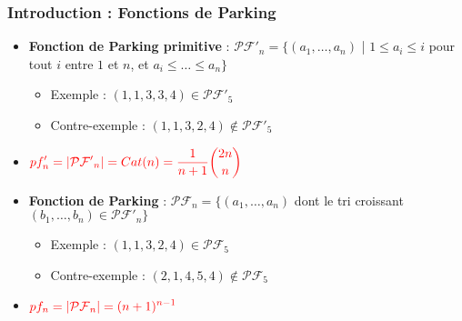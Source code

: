\documentclass{beamer}
\begin{document}
\begin{frame}
    \frametitle{Introduction : Fonctions de Parking}
    \begin{itemize}
        \item \textbf{Fonction de Parking primitive} : $\mathcal{PF'}_n =
            \{(a_1, \ldots, a_n)$ | $1 \leqslant a_i \leqslant i$ pour tout
            $i$ entre $1$ et $n$, et $a_i \leqslant \ldots \leqslant a_n\}$
        \begin{itemize}
            \item Exemple : $(1, 1, 3, 3, 4) \in \mathcal{PF'}_5$
            \item Contre-exemple : $(1, 1, 3, 2, 4) \not \in \mathcal{PF'}_5$
        \end{itemize}
        \item $\color{red}{\displaystyle pf'_n = |\mathcal{PF'}_n| = Cat(n)
            = \frac{1}{n+1}\binom{2n}{n}}$
        \item \textbf{Fonction de Parking} : $\mathcal{PF}_n = \{(a_1,
            \ldots, a_n)$ dont le tri croissant $(b_1, \ldots, b_n) \in
            \mathcal{PF'}_n\}$
        \begin{itemize}
            \item Exemple : $(1, 1, 3, 2, 4) \in \mathcal{PF}_5$
            \item Contre-exemple : $(2, 1, 4, 5, 4) \not \in \mathcal{PF}_5$
        \end{itemize}
        \item $\color{red}{\displaystyle pf_n = |\mathcal{PF}_n| =
            (n+1)^{n-1}}$
    \end{itemize}
\end{frame}
\end{document}
